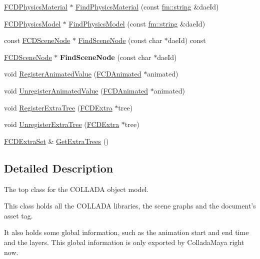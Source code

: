 \begin{DoxyCompactItemize}
\item 
\hyperlink{classFCDPhysicsMaterial}{FCDPhysicsMaterial} $\ast$ \hyperlink{classFCDocument_aa4714891197d8214b0f72c751996dadb}{FindPhysicsMaterial} (const \hyperlink{classfm_1_1stringT}{fm::string} \&daeId)
\item 
\hyperlink{classFCDPhysicsModel}{FCDPhysicsModel} $\ast$ \hyperlink{classFCDocument_a903d3efe5af4549448a21e1856168f82}{FindPhysicsModel} (const \hyperlink{classfm_1_1stringT}{fm::string} \&daeId)
\item 
const \hyperlink{classFCDSceneNode}{FCDSceneNode} $\ast$ \hyperlink{classFCDocument_aa09de8d1f7f7a1b49b4bee0fe1121909}{FindSceneNode} (const char $\ast$daeId) const 
\item 
\hypertarget{classFCDocument_a4bd0cf0f2dddfee37986cd52e2135374}{
\hyperlink{classFCDSceneNode}{FCDSceneNode} $\ast$ {\bfseries FindSceneNode} (const char $\ast$daeId)}
\label{classFCDocument_a4bd0cf0f2dddfee37986cd52e2135374}

\item 
void \hyperlink{classFCDocument_ac2260196c5b9c94a7afa4bdd9d8266f9}{RegisterAnimatedValue} (\hyperlink{classFCDAnimated}{FCDAnimated} $\ast$animated)
\item 
void \hyperlink{classFCDocument_a015b71ea5c4654c3b98a440fabb00fc0}{UnregisterAnimatedValue} (\hyperlink{classFCDAnimated}{FCDAnimated} $\ast$animated)
\item 
void \hyperlink{classFCDocument_a5a036fdae44aabc79d274b4d559e589b}{RegisterExtraTree} (\hyperlink{classFCDExtra}{FCDExtra} $\ast$tree)
\item 
void \hyperlink{classFCDocument_ab542a7245ed30260c993f1f66473fb99}{UnregisterExtraTree} (\hyperlink{classFCDExtra}{FCDExtra} $\ast$tree)
\item 
\hyperlink{classfm_1_1map}{FCDExtraSet} \& \hyperlink{classFCDocument_a1455338e112745cfc95d829b368f31ec}{GetExtraTrees} ()
\end{DoxyCompactItemize}


\subsection{Detailed Description}
The top class for the COLLADA object model.

This class holds all the COLLADA libraries, the scene graphs and the document's asset tag.

It also holds some global information, such as the animation start and end time and the layers. This global information is only exported by ColladaMaya right now. 

